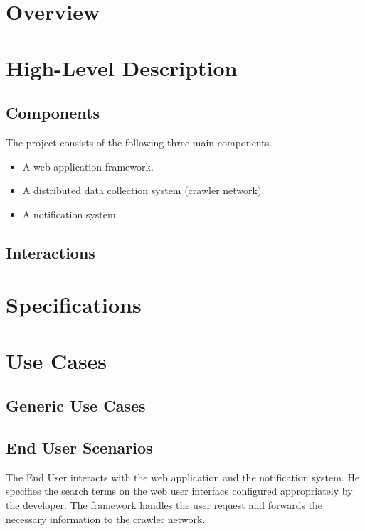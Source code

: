 \documentclass[a4paper,10pt]{article} \usepackage{anysize}
\begin{document}



\section{Overview}

\section{High-Level Description}
\subsection{Components}
    The project consists of the following three main components.
    \begin{itemize}
        \item A web application framework.
        \item A distributed data collection system (crawler network).
        \item A notification system.
    \end{itemize}
\subsection{Interactions}
    


\section{Specifications}
\section{Use Cases}

\subsection{Generic Use Cases}

\subsection{End User Scenarios}
    The End User interacts with the web application and the notification
    system. He specifies the search terms on the web user interface configured
    appropriately by the developer. The framework handles the user request and
    forwards the necessary information to the crawler network.
\end{document}
